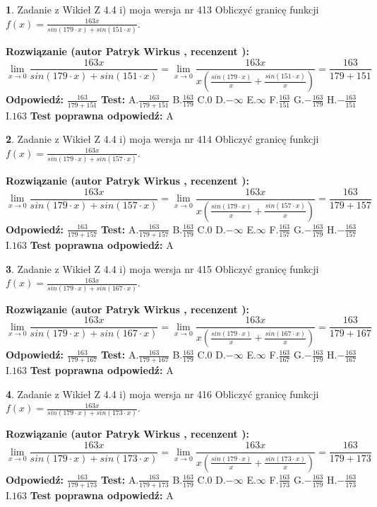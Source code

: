 \documentclass[12pt, a4paper]{article}
\theoremstyle{definition} %
\newtheorem{zad}{}
\newcommand{\zadStart}[1]{\begin{zad}#1\newline}
\newcommand{\zadStop}{\end{zad}}
\newcommand{\rozwStart}[2]{\noindent \textbf{Rozwiązanie (autor #1 , recenzent #2): }\newline}
\newcommand{\rozwStop}{\newline}
\newcommand{\odpStart}{\noindent \textbf{Odpowiedź:}\newline}
\newcommand{\odpStop}{\newline}
\newcommand{\testStart}{\noindent \textbf{Test:}\newline}
\newcommand{\testStop}{\newline}
\newcommand{\kluczStart}{\noindent \textbf{Test poprawna odpowiedź:}\newline}
\newcommand{\kluczStop}{\newline}
\begin{document}
\zadStart{Zadanie z Wikieł Z 4.4 i) moja wersja nr 413}
Obliczyć granicę funkcji $f(x)=\frac{163x}{sin(179\cdot x) +sin(151\cdot x)}$.
\zadStop
\rozwStart{Patryk Wirkus}{}
$$\lim\limits_{x\to 0}\frac{163x}{sin(179\cdot x) +sin(151\cdot x)}=\lim\limits_{x\to 0}\frac{163x}{x(\frac{sin(179\cdot x)}{x}+\frac{sin(151\cdot x)}{x})}=\frac{163}{179+151}$$
\rozwStop
\odpStart
$\frac{163}{179+151}$
\odpStop
\testStart
A.$\frac{163}{179+151}$
B.$\frac{163}{179}$
C.$0$
D.$-\infty$
E.$\infty$
F.$\frac{163}{151}$
G.$-\frac{163}{179}$
H.$-\frac{163}{151}$
I.$163$
\testStop
\kluczStart
A
\kluczStop



\zadStart{Zadanie z Wikieł Z 4.4 i) moja wersja nr 414}
Obliczyć granicę funkcji $f(x)=\frac{163x}{sin(179\cdot x) +sin(157\cdot x)}$.
\zadStop
\rozwStart{Patryk Wirkus}{}
$$\lim\limits_{x\to 0}\frac{163x}{sin(179\cdot x) +sin(157\cdot x)}=\lim\limits_{x\to 0}\frac{163x}{x(\frac{sin(179\cdot x)}{x}+\frac{sin(157\cdot x)}{x})}=\frac{163}{179+157}$$
\rozwStop
\odpStart
$\frac{163}{179+157}$
\odpStop
\testStart
A.$\frac{163}{179+157}$
B.$\frac{163}{179}$
C.$0$
D.$-\infty$
E.$\infty$
F.$\frac{163}{157}$
G.$-\frac{163}{179}$
H.$-\frac{163}{157}$
I.$163$
\testStop
\kluczStart
A
\kluczStop



\zadStart{Zadanie z Wikieł Z 4.4 i) moja wersja nr 415}
Obliczyć granicę funkcji $f(x)=\frac{163x}{sin(179\cdot x) +sin(167\cdot x)}$.
\zadStop
\rozwStart{Patryk Wirkus}{}
$$\lim\limits_{x\to 0}\frac{163x}{sin(179\cdot x) +sin(167\cdot x)}=\lim\limits_{x\to 0}\frac{163x}{x(\frac{sin(179\cdot x)}{x}+\frac{sin(167\cdot x)}{x})}=\frac{163}{179+167}$$
\rozwStop
\odpStart
$\frac{163}{179+167}$
\odpStop
\testStart
A.$\frac{163}{179+167}$
B.$\frac{163}{179}$
C.$0$
D.$-\infty$
E.$\infty$
F.$\frac{163}{167}$
G.$-\frac{163}{179}$
H.$-\frac{163}{167}$
I.$163$
\testStop
\kluczStart
A
\kluczStop



\zadStart{Zadanie z Wikieł Z 4.4 i) moja wersja nr 416}
Obliczyć granicę funkcji $f(x)=\frac{163x}{sin(179\cdot x) +sin(173\cdot x)}$.
\zadStop
\rozwStart{Patryk Wirkus}{}
$$\lim\limits_{x\to 0}\frac{163x}{sin(179\cdot x) +sin(173\cdot x)}=\lim\limits_{x\to 0}\frac{163x}{x(\frac{sin(179\cdot x)}{x}+\frac{sin(173\cdot x)}{x})}=\frac{163}{179+173}$$
\rozwStop
\odpStart
$\frac{163}{179+173}$
\odpStop
\testStart
A.$\frac{163}{179+173}$
B.$\frac{163}{179}$
C.$0$
D.$-\infty$
E.$\infty$
F.$\frac{163}{173}$
G.$-\frac{163}{179}$
H.$-\frac{163}{173}$
I.$163$
\testStop
\kluczStart
A
\kluczStop
\end{document}
